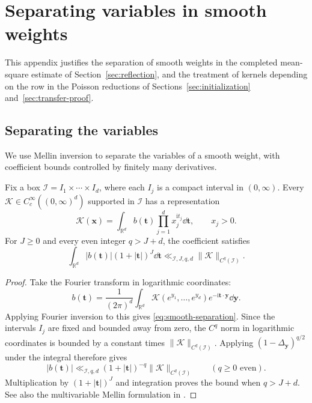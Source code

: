 \section{Separating variables in smooth weights}\label{app:weights}
This appendix justifies the separation of smooth weights in the
completed mean-square estimate of Section~\ref{sec:reflection}, and
the treatment of kernels depending on the row in the Poisson
reductions of Sections~\ref{sec:initialization} and~\ref{sec:transfer-proof}.

\subsection{Separating the variables}
We use Mellin inversion to separate the variables of a smooth
weight, with coefficient bounds controlled by finitely many derivatives.

\begin{lemma}\label{lem:smooth}
Fix a box $\mathcal I=I_1\times\cdots\times I_d$, where each $I_j$ is a
compact interval in $(0,\infty)$. Every $\mathcal K\in C_c^\infty((0,\infty)^d)$
supported in $\mathcal I$ has a representation
\begin{equation}\label{eq:smooth-separation}
 \mathcal K(\mathbf x)=\int_{\mathbb R^d}b(\mathbf t)
       \prod_{j=1}^d x_j^{\mathrm i t_j}\dd\mathbf t,
 \qquad x_j>0.
\end{equation}
For $J\ge0$ and every even integer $q>J+d$, the coefficient satisfies
\[
 \int_{\mathbb R^d}|b(\mathbf t)|(1+|\mathbf t|)^J\dd\mathbf t
 \ll_{\mathcal I,J,q,d}\|\mathcal K\|_{C^q(\mathcal I)}.
\]
\end{lemma}
\begin{proof}
Take the Fourier transform in logarithmic coordinates:
\[
 b(\mathbf t)=\frac1{(2\pi)^d}\int_{\mathbb R^d}
 \mathcal K(e^{y_1},\ldots,e^{y_d})
 e^{-\mathrm i\mathbf t\cdot\mathbf y}\dd\mathbf y.
\]
Applying Fourier inversion to this gives \eqref{eq:smooth-separation}. Since the intervals $I_j$ are fixed and bounded away from zero, the $C^q$ norm in logarithmic coordinates is bounded by a constant times
$\|\mathcal K\|_{C^q(\mathcal I)}$. Applying
$(1-\Delta_{\mathbf y})^{q/2}$ under the integral therefore gives
\[
 |b(\mathbf t)|\ll_{\mathcal I,q,d}
 (1+|\mathbf t|)^{-q}\|\mathcal K\|_{C^q(\mathcal I)}
 \qquad(q\ge0\text{ even}).
\]
Multiplication by $(1+|\mathbf t|)^J$ and integration proves the
bound when $q>J+d$. See also the multivariable Mellin formulation
in \cite[\S10.1, (130)--(131)]{PY19}.
\end{proof}


